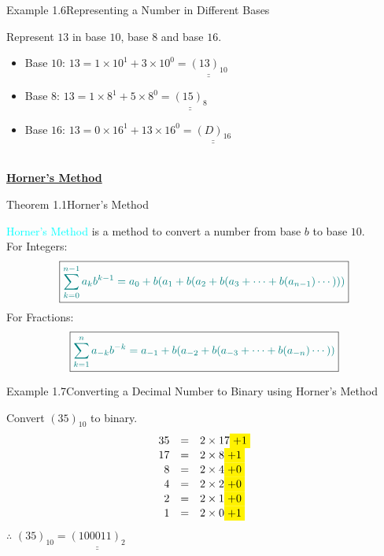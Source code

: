 \documentclass{book}
\begin{document}
\begin{egBox}{Example 1.6}{Representing a Number in Different Bases}
    \raggedright
    Represent $13$ in base $10$, base $8$ and base $16$.\\
    \begin{itemize}
        \item Base $10$: $13 = 1 \times 10^1 + 3 \times 10^0 = \underline{\underline{(13)_{10}}}$
        \item Base $8$: $13 = 1 \times 8^1 + 5 \times 8^0 = \underline{\underline{(15)_8}}$
        \item Base $16$: $13 = 0 \times 16^1 + 13 \times 16^0 = \underline{\underline{(D)_{16}}}$
    \end{itemize}
\end{egBox}
\\
\vspace{0.3cm}
\uline{\textbf{\large Horner's Method}}\\
\begin{thmBox}{Theorem 1.1}{Horner's Method}
    \raggedright
    \textcolor{cyan}{Horner's Method} is a method to convert a number from base $b$ to base $10$.\\
    For Integers:
    \[
    \boxed{\textcolor{teal}{\sum_{k=0}^{n-1} a_k b^{k-1} = a_0 + b(a_1 + b(a_2 + b(a_3 + \cdots + b(a_{n-1})\cdots)))}}
    \]
    For Fractions:
    \[
    \boxed{\textcolor{teal}{\sum_{k=1}^{n} a_{-k} b^{-k} = a_{-1} + b(a_{-2} + b(a_{-3} + \cdots + b(a_{-n})\cdots))}}
    \]
\end{thmBox}
\begin{egBox}{Example 1.7}{Converting a Decimal Number to Binary using Horner's Method}
    \raggedright
    Convert $(35)_{10}$ to binary.\\
    \[
    \begin{array}{rcl}
        35 &=& 2 \times 17 \colorbox{yellow}{+1} \\
        17 &=& 2 \times 8 \colorbox{yellow}{+1} \\
        8 &=& 2 \times 4 \colorbox{yellow}{+0} \\
        4 &=& 2 \times 2 \colorbox{yellow}{+0} \\
        2 &=& 2 \times 1 \colorbox{yellow}{+0} \\
        1 &=& 2 \times 0 \colorbox{yellow}{+1} \\
    \end{array}
    \]
    $\therefore$ $(35)_{10} = \underline{\underline{(100011)_2}}$
\end{egBox}
\end{document}
